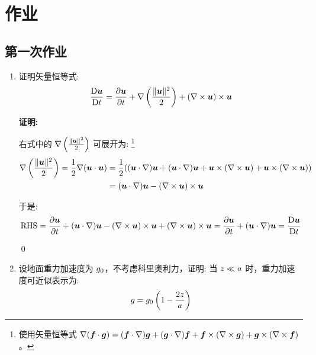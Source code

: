 \section*{作业}

\subsection*{第一次作业}

\begin{enumerate}

    \item 证明矢量恒等式:
    \begin{equation*}
        \matderiv{\vel} = \pde{\vel}{\timevar} + \nabla \left(\frac{\norm{\vel}^2}{2}\right) + (\nabla \times \vel) \times \vel
    \end{equation*}

    \vspace{1em}
    \textbf{证明:}

    右式中的 $\nabla \left(\frac{\lVert \bm{u} \rVert^2}{2}\right)$ 可展开为:
    \footnote{使用矢量恒等式 $\nabla (\bm{f} \cdot \bm{g}) = (\bm{f} \cdot \nabla) \bm{g} + (\bm{g} \cdot \nabla) \bm{f} + \bm{f} \times (\nabla \times \bm{g}) + \bm{g} \times (\nabla \times \bm{f})$。}
    \begin{align*}
        \nabla \left(\frac{\lVert \bm{u} \rVert^2}{2}\right) = \frac{1}{2} \nabla(\bm{u} \cdot \bm{u}) &= \frac{1}{2} ((\bm{u} \cdot \nabla) \bm{u} + (\bm{u} \cdot \nabla) \bm{u} + \bm{u} \times (\nabla \times \bm{u}) + \bm{u} \times (\nabla \times \bm{u})) \\
        &= (\bm{u} \cdot \nabla) \bm{u} - (\nabla \times \bm{u}) \times \bm{u}
    \end{align*}

    于是:
    \begin{equation*}
        \text{RHS} = \pde{\vel}{\timevar} + (\vel \cdot \nabla) \vel - (\nabla \times \vel) \times \vel + (\nabla \times \vel) \times \vel = \pde{\vel}{\timevar} + (\vel \cdot \nabla) \vel = \matderiv{\vel}
    \end{equation*}

    \qed

    \item 设地面重力加速度为 $g_0$，不考虑科里奥利力，证明: 当 $z \ll a$ 时，重力加速度可近似表示为:
    \begin{equation*}
        g = g_0 \left(1 - \frac{2z}{a}\right)
    \end{equation*}


\end{enumerate}
